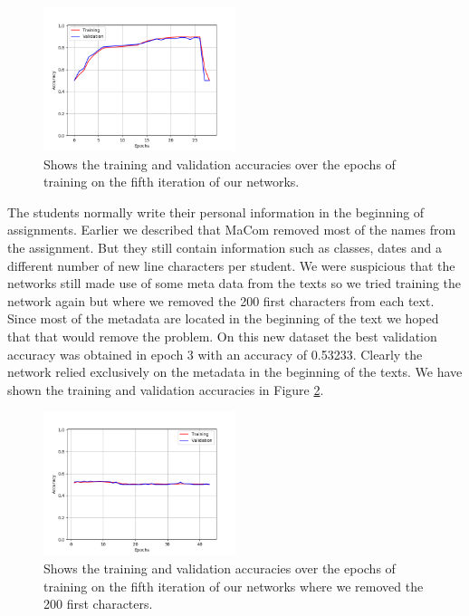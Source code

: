 \begin{figure}
    \centering
    \includegraphics[width=0.5\textwidth]{./pictures/experiments/network_5_accuracies.png}
    \caption{Shows the training and validation accuracies over the epochs of
        training on the fifth iteration of our networks.}
    \label{fig:network_5_accuracies}
\end{figure}

The students normally write their personal information in the beginning of
assignments. Earlier we described that MaCom removed most of the names from
the assignment. But they still contain information such as classes, dates and
a different number of new line characters per student. We were suspicious
that the networks still made use of some meta data from the texts so we tried
training the network again but where we removed the 200 first characters from
each text. Since most of the metadata are located in the beginning of the
text we hoped that that would remove the problem. On this new dataset the
best validation accuracy was obtained in epoch 3 with an accuracy of 0.53233.
Clearly the network relied exclusively on the metadata in the beginning of
the texts. We have shown the training and validation accuracies in Figure
\ref{fig:network_5_accuracies_2}.

\begin{figure}
    \centering
    \includegraphics[width=0.5\textwidth]{./pictures/experiments/network_5_accuracies_2.png}
    \caption{Shows the training and validation accuracies over the epochs of
        training on the fifth iteration of our networks where we removed the 200
        first characters.}
    \label{fig:network_5_accuracies_2}
\end{figure}


